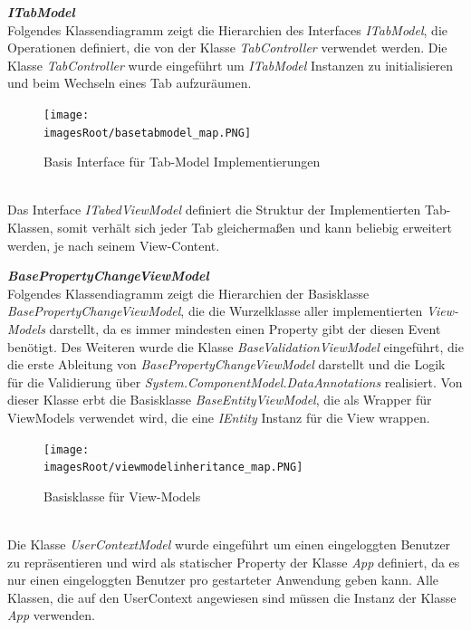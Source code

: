 \documentclass[11pt, a4paper, twoside]{article}   	%
\newcommand{\imagesRoot}{images}
\begin{document}
\newpage
\textbf{\emph{ITabModel}}\\
Folgendes Klassendiagramm zeigt die Hierarchien des Interfaces \emph{ITabModel}, die Operationen definiert, die von der Klasse \emph{TabController} verwendet werden. Die Klasse \emph{TabController} wurde eingeführt um \emph{ITabModel} Instanzen zu initialisieren und beim Wechseln eines Tab aufzuräumen.
\begin{figure}[h]
	\centering
	\texttt{[image: \\imagesRoot/basetabmodel\_map.PNG]}
	\caption
	{Basis Interface für Tab-Model Implementierungen}
\end{figure}
\ \\
Das Interface \emph{ITabedViewModel} definiert die Struktur der Implementierten Tab-Klassen, somit verhält sich jeder Tab gleichermaßen und kann beliebig erweitert werden, je nach seinem View-Content.

\newpage
\textbf{\emph{BasePropertyChangeViewModel}}\\
Folgendes Klassendiagramm zeigt die Hierarchien der Basisklasse \emph{BasePropertyChangeViewModel}, die die Wurzelklasse aller implementierten \emph{View-Models} darstellt, da es immer mindesten einen Property gibt der diesen Event benötigt. Des Weiteren wurde die Klasse \emph{BaseValidationViewModel} eingeführt, die die erste Ableitung von \emph{BasePropertyChangeViewModel} darstellt und die Logik für die Validierung über \emph{System.ComponentModel.DataAnnotations} realisiert. Von dieser Klasse erbt die Basisklasse \emph{BaseEntityViewModel}, die als Wrapper für ViewModels verwendet wird, die eine \emph{IEntity} Instanz für die View wrappen.
\begin{figure}[h]
	\centering
	\texttt{[image: \\imagesRoot/viewmodelinheritance\_map.PNG]}
	\caption
	{Basisklasse für View-Models}
\end{figure}
\ \\
Die Klasse \emph{UserContextModel} wurde eingeführt um einen eingeloggten Benutzer zu repräsentieren und wird als statischer Property der Klasse \emph{App} definiert, da es nur einen eingeloggten Benutzer pro gestarteter Anwendung geben kann. Alle Klassen, die auf den UserContext angewiesen sind müssen die Instanz der Klasse \emph{App} verwenden.
\end{document}
